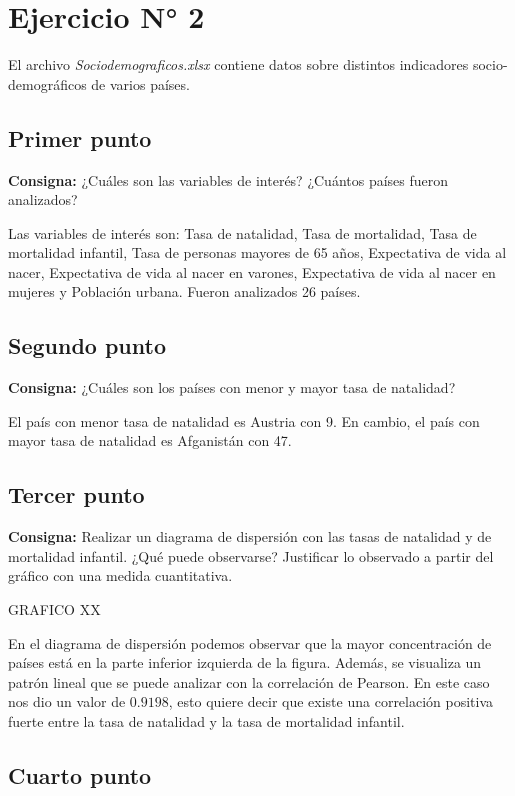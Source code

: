 \documentclass{article} %
\begin{document}
\section{Ejercicio N° 2}
El archivo \textit{Sociodemograficos.xlsx} contiene datos sobre distintos indicadores socio-demográficos de varios países.

\subsection{Primer punto}

\textbf{Consigna:} ¿Cuáles son las variables de interés? ¿Cuántos países fueron analizados?

Las variables de interés son: Tasa de natalidad, Tasa de mortalidad, Tasa de mortalidad infantil, Tasa de personas mayores de 65 años, Expectativa de vida al nacer, Expectativa de vida al nacer en varones, Expectativa de vida al nacer en mujeres y Población urbana. Fueron analizados 26 países.

\subsection{Segundo punto}

\textbf{Consigna:} ¿Cuáles son los países con menor y mayor tasa de natalidad?

El país con menor tasa de natalidad es Austria con 9. En cambio, el país con mayor tasa de natalidad es Afganistán con 47. 

\subsection{Tercer punto}

\textbf{Consigna:} Realizar un diagrama de dispersión con las tasas de natalidad y de mortalidad infantil. ¿Qué puede observarse? Justificar lo observado a partir del gráfico con una medida cuantitativa.

GRAFICO XX

En el diagrama de dispersión podemos observar que la mayor concentración de países está en la parte inferior izquierda de la figura. Además, se visualiza un patrón lineal que se puede analizar con la correlación de Pearson. En este caso nos dio un valor de $0.9198$, esto quiere decir que existe una correlación positiva fuerte entre la tasa de natalidad y la tasa de mortalidad infantil.

\subsection{Cuarto punto}
\end{document}
